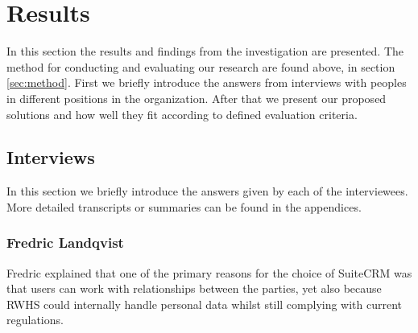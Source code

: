 
% 
%

\section{Results}
In this section the results and findings from the investigation are presented. The method for conducting and evaluating our research are found above, in section \ref{sec:method}. First we briefly introduce the answers from interviews with peoples in different positions in the organization. After that we present our proposed solutions and how well they fit according to defined evaluation criteria.



\subsection{Interviews}
In this section we briefly introduce the answers given by each of the interviewees. More detailed transcripts or summaries can be found in the appendices. 

\subsubsection{Fredric Landqvist}
\label{sec:method:fredrik-landqvis}

Fredric explained that one of the primary reasons for the choice of SuiteCRM was that users can work with relationships between the parties, yet also because RWHS could internally handle personal data whilst still complying with current regulations.

